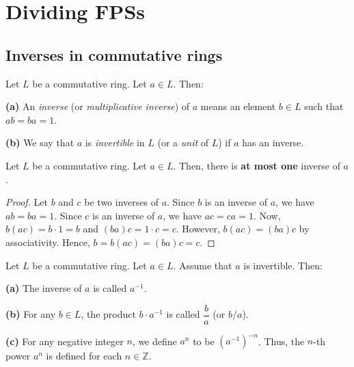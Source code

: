 \section{Dividing FPSs}

\subsection{Inverses in commutative rings}

\begin{definition}
\label{def.commring.inverse}
\leantarget
\leanok
Let $L$ be a commutative ring. Let $a\in L$. Then:

\textbf{(a)} An \emph{inverse} (or \emph{multiplicative inverse}) of $a$ means
an element $b\in L$ such that $ab=ba=1$.

\textbf{(b)} We say that $a$ is \emph{invertible} in $L$ (or a \emph{unit} of
$L$) if $a$ has an inverse.
\end{definition}

\begin{theorem}
\label{thm.commring.inverse-uni}
\leantarget
\leanok
Let $L$ be a commutative ring. Let $a\in L$.
Then, there is \textbf{at most one} inverse of $a$.
\end{theorem}

\begin{proof}
\leanok
Let $b$ and $c$ be two inverses of $a$.
Since $b$ is an inverse of $a$, we have $ab=ba=1$.
Since $c$ is an inverse of $a$, we have $ac=ca=1$.
Now, $b\left(ac\right) = b\cdot 1 = b$ and $\left(ba\right)c = 1\cdot c = c$.
However, $b\left(ac\right) = \left(ba\right)c$
by associativity. Hence, $b = b\left(ac\right) = \left(ba\right)c = c$.
\end{proof}

\begin{definition}
\label{def.commring.fracs}
\leantarget
\leanok
Let $L$ be a commutative ring. Let $a\in L$. Assume
that $a$ is invertible. Then:

\textbf{(a)} The inverse of $a$ is called $a^{-1}$.

\textbf{(b)} For any $b\in L$, the product $b\cdot a^{-1}$ is called
$\dfrac{b}{a}$ (or $b/a$).

\textbf{(c)} For any negative integer $n$, we define $a^{n}$ to be $\left(
a^{-1}\right)^{-n}$. Thus, the $n$-th power $a^{n}$ is defined for each
$n\in\mathbb{Z}$.
\end{definition}

